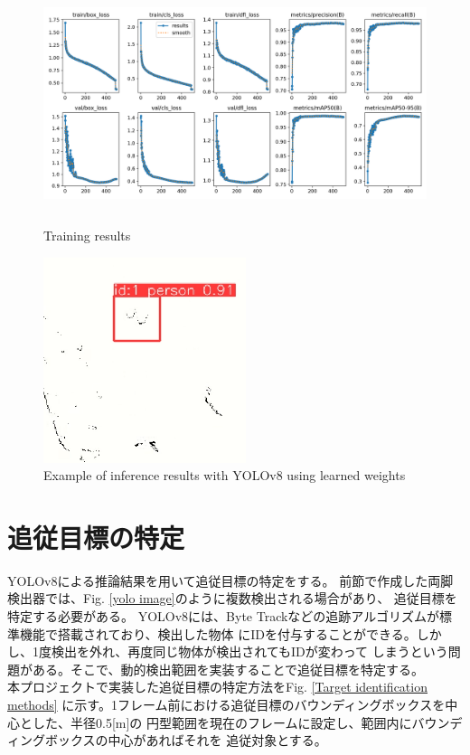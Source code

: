 \begin{figure}[h]
    \begin{center}
    \includegraphics[height=70mm,clip]{figure/yolov8-train-results.png}
    \caption{Training results}
    \label{Training results}
    \end{center}
\end{figure}

\begin{figure}[h]
    \begin{center}
    \includegraphics[height=60mm,clip]{figure/yolov8_laser_img.png}
    \caption{Example of inference results with YOLOv8 using learned weights}
    \label{Example of inference results with YOLOv8 using learned weights}
    \end{center}
\end{figure}

\section{追従目標の特定}
YOLOv8による推論結果を用いて追従目標の特定をする。
前節で作成した両脚検出器では、Fig. \ref{yolo image}のように複数検出される場合があり、
追従目標を特定する必要がある。
YOLOv8には、Byte Trackなどの追跡アルゴリズムが標準機能で搭載されており、検出した物体
にIDを付与することができる。しかし、1度検出を外れ、再度同じ物体が検出されてもIDが変わって
しまうという問題がある。そこで、動的検出範囲を実装することで追従目標を特定する。\\ \indent
本プロジェクトで実装した追従目標の特定方法をFig. \ref{Target identification methods}
に示す。1フレーム前における追従目標のバウンディングボックスを中心とした、半径0.5[m]の
円型範囲を現在のフレームに設定し、範囲内にバウンディングボックスの中心があればそれを
追従対象とする。

